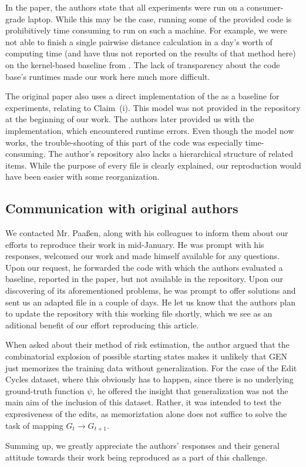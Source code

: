 In the paper, the authors state that all experiments were run on a consumer-grade laptop. While this may be the case, running some of the provided code is prohibitively time consuming to run on such a machine. For example, we were not able to finish a single pairwise distance calculation in a day's worth of computing time (and have thus not reported on the results of that method here) on  the kernel-based baseline from \cite{paassen2018time}. The lack of transparency about the code base's runtimes made our work here much more difficult.

The original paper also uses a direct implementation of the \cite{VGRNN} as a baseline for experiments, relating to \mbox{Claim (i).} This model was not provided in the repository at the beginning of our work. The authors later provided us with the implementation, which encountered runtime errors. Even though the model now works, the trouble-shooting of this part of the code was especially time-consuming. The author's repository also lacks a hierarchical structure of related items. While the purpose of every file is clearly explained, our reproduction would have been easier with some reorganization.



\subsection{Communication with original authors}

We contacted Mr. Paaßen, along with his colleagues to inform them about our efforts to reproduce their work in mid-January. He was prompt with his responses, welcomed our work and made himself available for any questions. Upon our request, he forwarded the code with which the authors evaluated a baseline, reported in the paper, but not available in the repository. Upon our discovering of its aforementioned problems, he was prompt to offer solutions and sent us an adapted file in a couple of days. He let us know that the authors plan to update the repository with this working file shortly, which we see as an aditional benefit of our effort reproducing this article.

When asked about their method of risk estimation, the author argued that the combinatorial explosion of possible starting states makes it unlikely that GEN just memorizes the training data without generalization. For the case of the Edit Cycles dataset, where this obviously has to happen, since there is no underlying ground-truth function $\psi$, he offered the insight that generalization was not the main aim of the inclusion of this dataset. Rather, it was intended to test the expresiveness of the edits, as memoriztation alone does not suffice to solve the task of mapping $G_{t} \to G_{t+1}$.

Summing up, we greatly appreciate the authors' responses and their general attitude towards their work being reproduced as a part of this challenge.
